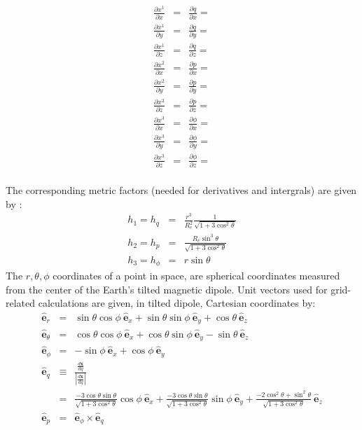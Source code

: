 \documentclass[11pt,letterpaper]{article}
\begin{document}
\begin{eqnarray}
\frac{\partial x^1}{\partial x} &=& \frac{\partial q}{\partial x} = \\
\frac{\partial x^1}{\partial y} &=& \frac{\partial q}{\partial y} = \\
\frac{\partial x^1}{\partial z} &=& \frac{\partial q}{\partial z} = \\
\frac{\partial x^2}{\partial x} &=& \frac{\partial p}{\partial x} = \\
\frac{\partial x^2}{\partial y} &=& \frac{\partial p}{\partial y} = \\
\frac{\partial x^2}{\partial z} &=& \frac{\partial p}{\partial z} = \\
\frac{\partial x^3}{\partial x} &=& \frac{\partial \phi}{\partial x} = \\
\frac{\partial x^3}{\partial y} &=& \frac{\partial \phi}{\partial y} = \\
\frac{\partial x^3}{\partial z} &=& \frac{\partial \phi}{\partial z} = \\
\end{eqnarray}

The corresponding metric factors (needed for derivatives and intergrals) are given by \citep{Huba:2000}:  
\begin{eqnarray}
h_1 = h_q &=& \frac{r^3}{R_e^2} \frac{1}{\sqrt{1+3 \cos^2 \theta}} \\
h_2 = h_p &=& \frac{R_e \sin^3 \theta}{\sqrt{1+3 \cos^2 \theta}} \\
h_3 = h_\phi &=& r \sin \theta
\end{eqnarray}
The $r,\theta,\phi$ coordinates of a point in space, are spherical coordinates measured from the center of the Earth's tilted magnetic dipole.  Unit vectors used for grid-related calculations are given, in tilted dipole, Cartesian coordinates by:  
\begin{eqnarray}
\hat{\mathbf{e}}_r &=& \sin \theta \cos \phi ~ \hat{\mathbf{e}}_x + \sin \theta \sin \phi ~ \hat{\mathbf{e}}_y + \cos \theta ~ \hat{\mathbf{e}}_z \\
\hat{\mathbf{e}}_\theta &=& \cos \theta \cos \phi ~ \hat{\mathbf{e}}_x + \cos \theta \sin \phi ~ \hat{\mathbf{e}}_y - \sin \theta ~ \hat{\mathbf{e}}_z \\
\hat{\mathbf{e}}_\phi &=& -\sin \phi ~ \hat{\mathbf{e}}_x + \cos \phi ~ \hat{\mathbf{e}}_y \\
\hat{\mathbf{e}}_q &\equiv& \frac{\frac{d \mathbf{x}}{d q}}{\left| \frac{d \mathbf{x}}{d q} \right|} \nonumber \\
 &=& \frac{-3 \cos \theta \sin \theta }{\sqrt{1+3 \cos^2 \theta } } \cos \phi ~ \hat{\mathbf{e}}_x + \frac{-3 \cos \theta \sin \theta }{\sqrt{1+3 \cos^2 \theta } } \sin \phi ~ \hat{\mathbf{e}}_y + \frac{-2 \cos^2 \theta + \sin^2 \theta }{\sqrt{1+3 \cos^2 \theta } } ~ \hat{\mathbf{e}}_z \\
\hat{\mathbf{e}}_p &=& \hat{\mathbf{e}}_\phi \times \hat{\mathbf{e}}_q
\end{eqnarray}
\end{document}
